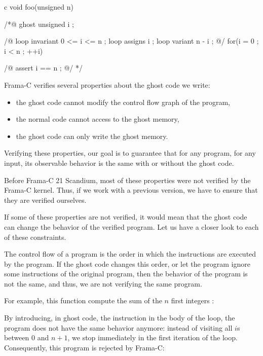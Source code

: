 \begin{CodeBlock}{c}
void foo(unsigned n){
 /*@ ghost
   unsigned i ;

   /@
     loop invariant 0 <= i <= n ;
     loop assigns i ;
     loop variant n - i ;
   @/
   for(i = 0 ; i < n ; ++i){

   }
   /@ assert i == n ; @/
 */
}
\end{CodeBlock}




Frama-C verifies several properties about the ghost code we write:


\begin{itemize}
\item the ghost code cannot modify the control flow graph of the program,
\item the normal code cannot access to the ghost memory,
\item the ghost code can only write the ghost memory.
\end{itemize}


Verifying these properties, our goal is to guarantee that for any
program, for any input, its observable behavior is the same with or
without the ghost code.


\begin{Warning}
  Before Frama-C 21 Scandium, most of these properties were not
  verified by the Frama-C kernel. Thus, if we work with a previous
  version, we have to ensure that they are verified ourselves.
\end{Warning}


If some of these properties are not verified, it would mean that
the ghost code can change the behavior of the verified program.
Let us have a closer look to each of these constraints.




The control flow of a program is the order in which the instructions
are executed by the program. If the ghost code changes this order, or
let the program ignore some instructions of the original program, then
the behavior of the program is not the same, and thus, we are not
verifying the same program.


For example, this function compute the sum of the $n$ first integers :




By introducing, in ghost code, the instruction  in
the body of the loop, the program does not have the same behavior
anymore: instead of visiting all $i$s between $0$ and $n+1$, we stop
immediately in the first iteration of the loop. Consequently, this
program is rejected by Frama-C:


